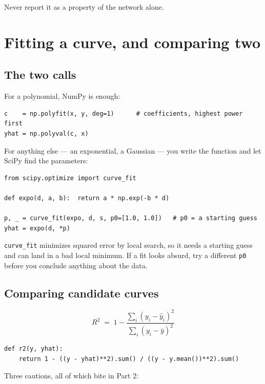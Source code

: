 \documentclass[11pt]{article}
\begin{document}
\begin{keybox}
 Never
report it as a property of the network alone.
\end{keybox}

\section{Fitting a curve, and comparing two}

\subsection{The two calls}

For a polynomial, NumPy is enough:

\begin{lstlisting}
c    = np.polyfit(x, y, deg=1)      # coefficients, highest power first
yhat = np.polyval(c, x)
\end{lstlisting}

For anything else --- an exponential, a Gaussian --- you write the function and
let SciPy find the parameters:

\begin{lstlisting}
from scipy.optimize import curve_fit

def expo(d, a, b):  return a * np.exp(-b * d)

p, _ = curve_fit(expo, d, s, p0=[1.0, 1.0])   # p0 = a starting guess
yhat = expo(d, *p)
\end{lstlisting}

\texttt{curve\_fit} minimizes squared error by local search, so it needs a
starting guess and can land in a bad local minimum. If a fit looks absurd, try a
different \texttt{p0} before you conclude anything about the data.

\subsection{Comparing candidate curves}

\[
R^2 \;=\; 1 - \frac{\sum_i (y_i - \hat{y}_i)^2}{\sum_i (y_i - \bar{y})^2}
\]

\begin{lstlisting}
def r2(y, yhat):
    return 1 - ((y - yhat)**2).sum() / ((y - y.mean())**2).sum()
\end{lstlisting}

Three cautions, all of which bite in Part 2:
\end{document}
